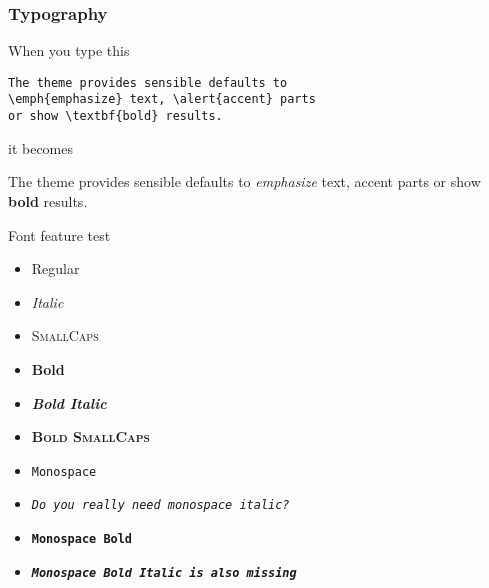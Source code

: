 \documentclass[12pt]{beamer}
\begin{document}
\begin{frame}[fragile]
\frametitle{Typography}
When you type this

\begin{verbatim}The theme provides sensible defaults to
\emph{emphasize} text, \alert{accent} parts
or show \textbf{bold} results.\end{verbatim}

\begin{center}it becomes\end{center}

The theme provides sensible defaults to \emph{emphasize} text,
  \alert{accent} parts or show \textbf{bold} results.
\end{frame}

\begin{frame}{Font feature test}
  \begin{itemize}
    \item Regular
    \item \textit{Italic}
    \item \textsc{SmallCaps}
    \item \textbf{Bold}
    \item \textbf{\textit{Bold Italic}}
    \item \textbf{\textsc{Bold SmallCaps}}
    \item \texttt{Monospace}
    \item \texttt{\textit{Do you really need monospace italic?}}
    \item \texttt{\textbf{Monospace Bold}}
    \item \texttt{\textbf{\textit{Monospace Bold Italic is also missing}}}
  \end{itemize}
\end{frame}
\end{document}
